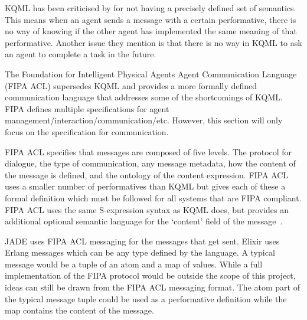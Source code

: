 KQML has been criticised by  for not having a precisely defined set of semantics.
This means when an agent sends a message with a certain performative, there is no way of knowing if the other agent has implemented the same meaning of that performative.
Another issue they mention is that there is no way in KQML to ask an agent to complete a task in the future.

The Foundation for Intelligent Physical Agents Agent Communication Language (FIPA ACL) supersedes KQML and provides a more formally defined communication language that addresses some of the shortcomings of KQML\@.
FIPA defines multiple specifications for agent management/interaction/communication/etc.
However, this section will only focus on the specification for communication.

FIPA ACL specifies that messages are composed of five levels.
The protocol for dialogue, the type of communication, any message metadata, how the content of the message is defined, and the ontology of the content expression.
FIPA ACL uses a smaller number of performatives than KQML but gives each of these a formal definition which must be followed for all systems that are FIPA compliant.
FIPA ACL uses the same S-expression syntax as KQML does, but provides an additional optional semantic language for the `content' field of the message~\cite{obrien1998fipa}.

JADE uses FIPA ACL messaging for the messages that get sent.
Elixir uses Erlang messages which can be any type defined by the language.
A typical message would be a tuple of an atom and a map of values.
While a full implementation of the FIPA protocol would be outside the scope of this project, ideas can still be drawn from the FIPA ACL messaging format.
The atom part of the typical message tuple could be used as a performative definition while the map contains the content of the message.
